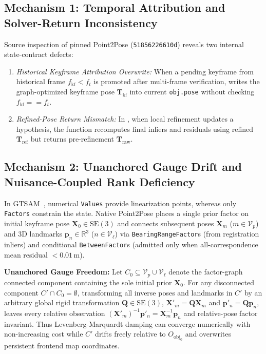 \documentclass[10pt,journal]{IEEEtran}
\begin{document}
\subsection{Mechanism 1: Temporal Attribution and Solver-Return Inconsistency}
Source inspection of pinned Point2Pose (\texttt{51856226610d}) reveals two internal state-contract defects:
\begin{enumerate}
    \item \emph{Historical Keyframe Attribution Overwrite:} When a pending keyframe from historical frame $f_{\mathrm{kf}}<f_t$ is promoted after multi-frame verification,  writes the graph-optimized keyframe pose $\mathbf{T}_{\mathrm{kf}}$ into current \texttt{obj.pose} without checking $f_{\mathrm{kf}}==f_t$.
    \item \emph{Refined-Pose Return Mismatch:} In , when local refinement updates a hypothesis, the function recomputes final inliers and residuals using refined $\mathbf{T}_{\mathrm{ref}}$ but returns pre-refinement $\mathbf{T}_{\mathrm{raw}}$.
\end{enumerate}

\subsection{Mechanism 2: Unanchored Gauge Drift and Nuisance-Coupled Rank Deficiency}
In GTSAM~\cite{gtsam}, numerical \texttt{Values} provide linearization points, whereas only \texttt{Factors} constrain the state. Native Point2Pose places a single prior factor on initial keyframe pose $\mathbf{X}_0\in\mathrm{SE}(3)$ and connects subsequent poses $\mathbf{X}_m$ ($m\in\mathcal{V}_p$) and 3D landmarks $\mathbf{p}_n\in\mathbb{R}^3$ ($n\in\mathcal{V}_\ell$) via \texttt{BearingRangeFactor}s (from registration inliers) and conditional \texttt{BetweenFactor}s (admitted only when all-correspondence mean residual $<0.01\,\mathrm{m}$).

\textbf{Unanchored Gauge Freedom:} Let $C_0\subseteq\mathcal{V}_p\cup\mathcal{V}_\ell$ denote the factor-graph connected component containing the sole initial prior $\mathbf{X}_0$. For any disconnected component $C'\cap C_0=\emptyset$, transforming all inverse poses and landmarks in $C'$ by an arbitrary global rigid transformation $\mathbf{Q}\in\mathrm{SE}(3)$, $\mathbf{X}'_m=\mathbf{Q}\mathbf{X}_m$ and $\mathbf{p}'_n=\mathbf{Q}\mathbf{p}_n$, leaves every relative observation $(\mathbf{X}'_m)^{-1}\mathbf{p}'_n=\mathbf{X}_m^{-1}\mathbf{p}_n$ and relative-pose factor invariant. Thus Levenberg-Marquardt damping can converge numerically with non-increasing cost while $C'$ drifts freely relative to $O_{\mathrm{obj}_0}$ and overwrites persistent frontend map coordinates.
\end{document}
